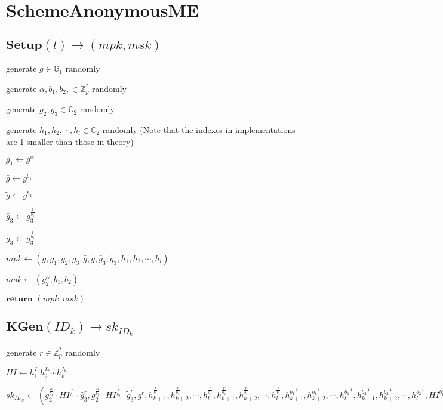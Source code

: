 \documentclass[a4paper]{article}
\begin{document}
\section{SchemeAnonymousME}

\subsection{$\textbf{Setup}(l) \rightarrow (\textit{mpk}, \textit{msk})$}

generate $g \in \mathbb{G}_1$ randomly

generate $\alpha, b_1, b_2, \in \mathbb{Z}_p^*$ randomly

generate $g_2, g_3 \in \mathbb{G}_2$ randomly

generate $h_1, h_2, \cdots, h_l \in \mathbb{G}_2$ randomly (Note that the indexes in implementations are 1 smaller than those in theory)

$g_1 \gets g^\alpha$

$\bar{g} \gets g^{b_1}$

$\tilde{g} \gets g^{b_2}$

$\bar{g}_3 \gets g_3^{\frac{1}{b_1}}$

$\tilde{g}_3 \gets g_3^{\frac{1}{b_2}}$

$\textit{mpk} \gets (g, g_1, g_2, g_3, \bar{g}, \tilde{g}, \bar{g}_3, \tilde{g}_3, h_1, h_2, \cdots, h_l)$

$\textit{msk} \gets (g_2^\alpha, b_1, b_2)$

$\textbf{return }(\textit{mpk}, \textit{msk})$

\subsection{$\textbf{KGen}(\textit{ID}_k) \rightarrow \textit{sk}_{\textit{ID}_k}$}

generate $r \in \mathbb{Z}_p^*$ randomly

$\textit{HI} \gets h_1^{I_1}h_2^{I_2}\cdots h_k^{I_k}$

$\textit{sk}_{\textit{ID}_k} \gets (
g_2^{\frac{\alpha}{b_1}} \cdot \textit{HI}^{\frac{r}{b_1}} \cdot \bar{g}_3^r,
g_2^{\frac{\alpha}{b_2}} \cdot \textit{HI}^{\frac{r}{b_2}} \cdot \tilde{g}_3^r,
g^r,
h_{k + 1}^{\frac{r}{b_1}}, h_{k + 2}^{\frac{r}{b_1}}, \cdots, h_l^{\frac{r}{b_1}},
h_{k + 1}^{\frac{r}{b_2}}, h_{k + 2}^{\frac{r}{b_1}}, \cdots, h_l^{\frac{r}{b_1}},
h_{k + 1}^{b_1^{-1}}, h_{k + 2}^{b_1^{-1}}, \cdots, h_l^{b_1^{-1}},
h_{k + 1}^{b_2^{-1}}, h_{k + 2}^{b_2^{-1}}, \cdots, h_l^{b_2^{-1}},
\textit{HI}^{b_1^{-1}}, \textit{HI}^{b_2^{-1}}
)$
\end{document}
